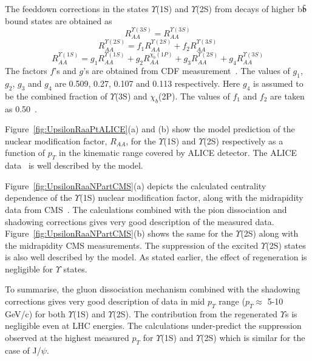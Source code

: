 {The feeddown corrections in the states $\Upsilon$(1S) and $\Upsilon$(2S) 
from decays of higher b$\bar{\rm b}$ bound states are obtained as
  \begin{equation}
    R_{AA}^{\Upsilon(3S)} = R_{AA}^{\Upsilon(3S)} %
  \end{equation}
  \begin{equation}
    R_{AA}^{\Upsilon(2S)} = f_1 R_{AA}^{\Upsilon(2S)} +  f_2 R_{AA}^{\Upsilon(3S)}  %
  \end{equation}
   \begin{equation}
    R_{AA}^{\Upsilon(1S)} = g_1 R_{AA}^{\Upsilon(1S)} +  g_2 R_{AA}^{\chi_b(1P)} + g_3 R_{AA}^{\Upsilon(2S)} + g_4 R_{AA}^{\Upsilon(3S)} %
  \end{equation}
The factors $f$'s and $g$'s are obtained from CDF measurement~\cite{Affolder:1999wm}.
The values of $g_1$, $g_2$, $g_3$ and $g_4$ are 0.509, 0.27, 0.107
and 0.113 respectively. Here $g_4$ is assumed to be the combined fraction of 
$\Upsilon$(3S) and $\chi_b$(2P).
The values of $f_1$ and $f_2$ are taken as 0.50~\cite{Strickland:2011aa}.


Figure~\ref{fig:UpsilonRaaPtALICE}(a) and (b) show the model 
prediction \cite{Kumar:2019xdj} of the nuclear modification factor, $R_{AA}$, for the $\Upsilon$(1S)
and $\Upsilon$(2S) respectively as a function of $p_T$ in the kinematic range
covered by ALICE detector. The ALICE data~\cite{ALICE:2020wwx} is well described by the model.

Figure~\ref{fig:UpsilonRaaNPartCMS}(a) depicts the calculated \cite{Kumar:2019xdj}
centrality dependence of the $\Upsilon$(1S) nuclear
modification factor, along with the midrapidity data from CMS~\cite{CMS:2018zza}.
The calculations combined with the pion dissociation and shadowing corrections 
gives very good description of the measured data. Figure~\ref{fig:UpsilonRaaNPartCMS}(b)
shows the same for the $\Upsilon$(2S) along with the midrapidity
CMS measurements. The suppression of the excited $\Upsilon$(2S) states 
is also well described by the model. As stated earlier, the effect of regeneration is
negligible for $\Upsilon$ states. 

To summarise, the gluon dissociation mechanism combined with the shadowing
corrections gives very good description of data in mid $p_{T}$ range ($p_{T}\approx$ 5-10 GeV/c)
for both $\Upsilon$(1S) and $\Upsilon$(2S).
The contribution from the regenerated $\Upsilon$s is negligible even at LHC energies.
The calculations under-predict the suppression observed at the highest measured
$p_{T}$ for $\Upsilon$(1S) and $\Upsilon$(2S) which is similar for the case
of J/$\psi$.


}
